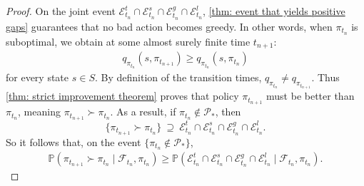 \begin{proof}
On the joint event $\mathcal E^t_{t_n} \cap \mathcal E^s_{t_n} \cap \mathcal E^g_{t_n} \cap \mathcal E^l_{t_n}$, \autoref{thm: event that yields positive gaps} guarantees that no bad action becomes greedy. 
In other words, when $\pi_{t_n}$ is suboptimal, we obtain at some almost surely finite time $t_{n+1}$:
\begin{align}
\label{eq: condition that policy improves}
q_{\pi_{t_n}} ( s, \pi_{t_{n+1}} ) \ge q_{\pi_{t_n}} (s,\pi_{t_n} )
\end{align}
for every state $s\in S$.
By definition of the transition times, $q_{\pi_{t_n}} \neq q_{\pi_{t_{n+1}}}$.
Thus \autoref{thm: strict improvement theorem} proves that policy $\pi_{t_{n+1}}$ must be better than $\pi_{t_{n}}$, meaning $\pi_{t_{n+1}} \succ \pi_{t_n}$.
As a result, if $\pi_{t_n} \notin \mathcal P_*$, then
\[
\{\pi_{t_{n+1}} \succ \pi_{t_n} \}
\ \supseteq \
\mathcal E^t_{t_n} \cap \mathcal E^s_{t_n} \cap \mathcal E^g_{t_n} \cap \mathcal E^l_{t_n} .
\]
So it follows that, on the event $\{\pi_{t_n} \notin \mathcal P_*\}$,
\begin{align*}
\mathbb P\!\left(
\pi_{t_{n+1}} \succ \pi_{t_n}
\mid \mathcal F_{t_n}, \pi_{t_n}
\right)
\ge
\mathbb P ( \mathcal E^t_{t_n} \cap \mathcal E^s_{t_n} \cap \mathcal E^g_{t_n} \cap \mathcal E^l_{t_n} \mid \mathcal F_{t_n}, \pi_{t_n} ).
\end{align*}


\end{proof}
